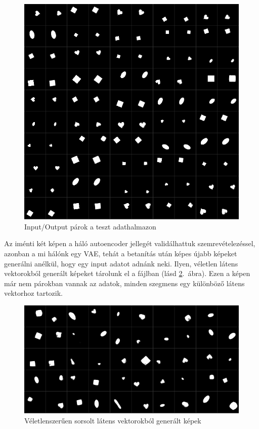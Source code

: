  \begin{figure}[h!]
\begin{center}
  
  
	\begin{center}
	\includegraphics[width=0.75\linewidth]{testpng.png}
	\end{center}
	
  \caption{Input/Output párok a teszt adathalmazon}\label{testpng}
\end{center}
\end{figure}

Az iménti két képen a háló autoencoder jellegét validálhattuk szemrevételezéssel, azonban a mi hálónk egy VAE, tehát a betanítás után képes újabb képeket generálni anélkül, hogy egy input adatot adnánk neki. Ilyen, véletlen látens vektorokból generált képeket tárolunk el a  fájlban (lásd \ref{randompng}.~ábra). Ezen a képen már nem párokban vannak az adatok, minden szegmens egy különböző látens vektorhoz tartozik.

\begin{figure}[h!]
\begin{center}
  
  
	\begin{center}
	\includegraphics[width=0.75\linewidth]{randompng.png}
	\end{center}
	
  \caption{Véletlenszerűen sorsolt látens vektorokból generált képek}\label{randompng}
\end{center}
\end{figure}

